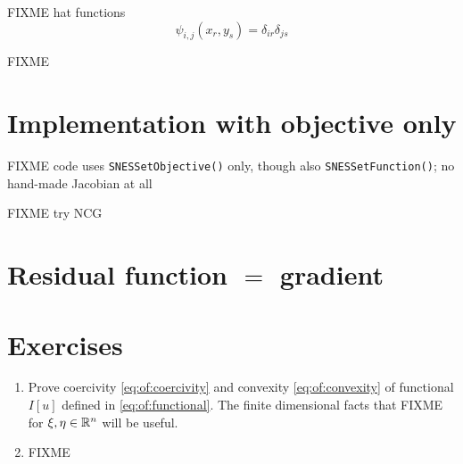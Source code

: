 FIXME hat functions
    $$\psi_{i,j}(x_r,y_s) = \delta_{ir} \delta_{js}$$

\begin{marginfigure}

\caption{FIXME}
\label{fig:q1hat}
\end{marginfigure}


\section{Implementation with objective only}

FIXME code uses \texttt{SNESSetObjective()} only, though also \texttt{SNESSetFunction()}; no hand-made Jacobian at all

FIXME try NCG






\section{Residual function $=$ gradient}



\section{Exercises}

\renewcommand{\labelenumi}{\arabic{chapter}.\arabic{enumi}\quad}
\renewcommand{\labelenumii}{(\alph{enumii})}
\begin{enumerate}
\item Prove coercivity \eqref{eq:of:coercivity} and convexity \eqref{eq:of:convexity} of functional $I[u]$ defined in \eqref{eq:of:functional}.  The finite dimensional facts that FIXME for $\xi,\eta\in\mathbb{R}^n$ will be useful.
\item FIXME
\end{enumerate}
